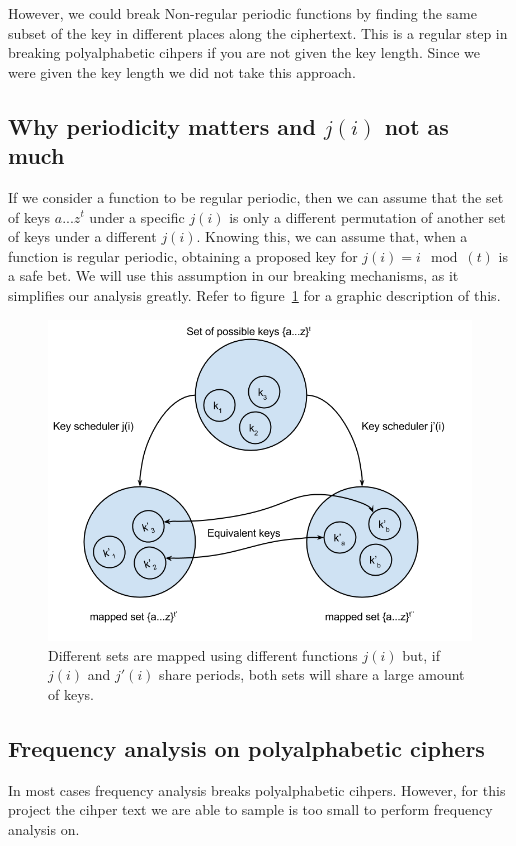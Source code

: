 \documentclass[pdftex,12pt,letter]{article}
\begin{document}
However, we could break Non-regular periodic functions by finding the same subset of the key in different places 
along the ciphertext. This is a regular step in breaking polyalphabetic cihpers if you are 
not given the key length. Since we were given the key length we did not take this approach.   

\subsection{Why periodicity matters and $j(i)$ not as much}

If we consider a function to be regular periodic, then we can assume that the 
set of keys ${a...z}^t$ under a specific $j(i)$ is only a different permutation
of another set of keys under a different $j(i)$. Knowing this, we can
assume that, when a function is regular periodic, obtaining a proposed key for
$j(i) = i \mod(t)$ is a safe bet. We will use this assumption in our breaking 
mechanisms, as it simplifies our analysis greatly. Refer to figure~\ref{key-sets} 
for a graphic description of this.

\begin{figure}[ht!]
    \centering
    \includegraphics[width=.8\textwidth]{key-mapping}
    \caption{Different sets are mapped using different functions $j(i)$ but,
    if $j(i)$ and $j'(i)$ share periods, both sets will share a large amount of keys.}
    \label{key-sets}
\end{figure}

\subsection{Frequency analysis on polyalphabetic ciphers}

In most cases frequency analysis breaks polyalphabetic cihpers. However,
for this project the cihper text we are able to sample is too small to 
perform frequency analysis on. 
\end{document}
